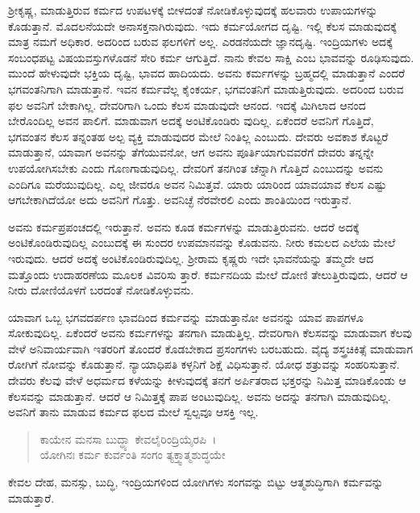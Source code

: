 ಶ‍್ರೀಕೃಷ್ಣ, ಮಾಡುತ್ತಿರುವ ಕರ್ಮದ ಉಪಟಳಕ್ಕೆ ಬೀಳದಂತೆ ನೋಡಿಕೊಳ್ಳುವುದಕ್ಕೆ ಹಲವಾರು ಉಪಾಯಗಳನ್ನು ಕೊಡುತ್ತಾನೆ. ಮೊದಲನೆಯದೇ ಅನಾಸಕ್ತನಾಗಿರುವುದು. ಇದು ಕರ್ಮಯೋಗದ ದೃಷ್ಟಿ. ಇಲ್ಲಿ ಕೆಲಸ ಮಾಡುವುದಕ್ಕೆ ಮಾತ್ರ ನಮಗೆ ಅಧಿಕಾರ. ಅದರಿಂದ ಬರುವ ಫಲಗಳಿಗೆ ಅಲ್ಲ. ಎರಡನೆಯದೇ ಜ್ಞಾನದೃಷ್ಟಿ. ಇಂದ್ರಿಯಗಳು ಅದಕ್ಕೆ ಸಂಬಂಧಪಟ್ಟ ವಿಷಯವಸ್ತುಗಳೊಡನೆ ಸೇರಿ ಕರ್ಮ ಆಗುತ್ತಿದೆ. ನಾನು ಕೇವಲ ಸಾಕ್ಷಿ ಎಂಬ ಭಾವವನ್ನು ರೂಢಿಸುವುದು. ಮುಂದೆ ಹೇಳುವುದೇ ಭಕ್ತಿಯ ದೃಷ್ಟಿ, ಭಾವದ ಹಾದಿಯದು. ಅವನು ಕರ್ಮಗಳನ್ನು ಬ್ರಹ್ಮದಲ್ಲಿ ಮಾಡುತ್ತಾನೆ ಎಂದರೆ ಭಗವಂತನಿಗಾಗಿ ಮಾಡುತ್ತಾನೆ. ಇವನ ಕರ್ಮವೆಲ್ಲ ಕೈಂಕರ್ಯ, ಭಗವಂತನಿಗೆ ಮಾಡುತ್ತಿರುವುದು. ಅದರಿಂದ ಬರುವ ಫಲ ಅವನಿಗೆ ಬೇಕಾಗಿಲ್ಲ. ದೇವರಿಗಾಗಿ ಒಂದು ಕೆಲಸ ಮಾಡುವುದೇ ಆನಂದ. ಇದಕ್ಕೆ ಮಿಗಿಲಾದ ಆನಂದ ಬೇರೊಂದಿಲ್ಲ ಅವನ ಪಾಲಿಗೆ. ಮಾಡುವಾಗ ಅದಕ್ಕೆ ಅಂಟಿಕೊಂಡಿರು ವುದಿಲ್ಲ. ಏಕೆಂದರೆ ಅವನಿಗೆ ಗೊತ್ತಿದೆ, ಭಗವಂತನ ಕೆಲಸ ತನ್ನಂತಹ ಅಲ್ಪ ವ್ಯಕ್ತಿ ಮಾಡುವುದರ ಮೇಲೆ ನಿಂತಿಲ್ಲ ಎಂಬುದು. ದೇವರು ಅವಕಾಶ ಕೊಟ್ಟರೆ ಮಾಡುತ್ತಾನೆ, ಯಾವಾಗ ಅವನನ್ನು ತೆಗೆಯುವನೋ, ಆಗ ಅವನು ಪೂರ್ತಿಯಾಗುವವರೆಗೆ ದೇವರು ತನ್ನನ್ನೇ ಉಪಯೋಗಿಸಬೇಕು ಎಂದು ಗೊಣಗಾಡುವುದಿಲ್ಲ. ದೇವರಿಗೆ ತನಗಿಂತ ಚೆನ್ನಾಗಿ ಗೊತ್ತಿದೆ ಎಂಬುದನ್ನು ಅವನು ಎಂದಿಗೂ ಮರೆಯುವುದಿಲ್ಲ. ಎಲ್ಲ ಜೀವರೂ ಅವನ ನಿಮಿತ್ತವೆ. ಯಾರು ಯಾರಿಂದ ಯಾವಯಾವ ಕೆಲಸ ಎಷ್ಟು ಆಗಬೇಕಾಗಿದೆಯೋ ಅದು ಅವನಿಗೆ ಗೊತ್ತು. ಅವನಿಚ್ಛೆ ನೆರವೇರಲಿ ಎಂದು ಶಾಂತಿಯಿಂದ ಇರುತ್ತಾನೆ.

ಅವನು ಕರ್ಮಪ್ರಪಂಚದಲ್ಲಿ ಇರುತ್ತಾನೆ. ಅವನು ಕೂಡ ಕರ್ಮಗಳನ್ನು ಮಾಡುತ್ತಿರುವನು. ಆದರೆ ಅದಕ್ಕೆ ಅಂಟಿಕೊಂಡಿರುವುದಿಲ್ಲ ಎಂಬುದಕ್ಕೆ ಈ ಸುಂದರ ಉಪಮಾನವನ್ನು ಕೊಡುವನು. ನೀರು ಕಮಲದ ಎಲೆಯ ಮೇಲೆ ಇರುವುದು. ಆದರೆ ಅದಕ್ಕೆ ಅಂಟಿಕೊಂಡಿರುವುದಿಲ್ಲ. ಶ‍್ರೀರಾಮ ಕೃಷ್ಣರು ಇದೇ ಭಾವನೆಯನ್ನು ತಮ್ಮದೇ ಆದ ಮತ್ತೊಂದು ಉದಾಹರಣೆಯ ಮೂಲಕ ವಿವರಿಸು ತ್ತಾರೆ. ಕರ್ಮನದಿಯ ಮೇಲೆ ದೋಣಿ ತೇಲುತ್ತಿರುವುದು, ಆದರೆ ಆ ನೀರು ದೋಣಿಯೊಳಗೆ ಬರದಂತೆ ನೋಡಿಕೊಳ್ಳುವನು.

ಯಾವಾಗ ಒಬ್ಬ ಭಗವದರ್ಪಣ ಭಾವದಿಂದ ಕರ್ಮವನ್ನು ಮಾಡುತ್ತಾನೋ ಅವನನ್ನು ಯಾವ ಪಾಪಗಳೂ ಸೋಕುವುದಿಲ್ಲ. ಏಕೆಂದರೆ ಅವನು ಕರ್ಮಗಳನ್ನು ತನಗಾಗಿ ಮಾಡುತ್ತಿಲ್ಲ. ದೇವರಿಗಾಗಿ ಕೆಲಸವನ್ನು ಮಾಡುವಾಗ ಕೆಲವು ವೇಳೆ ಅನಿವಾರ್ಯವಾಗಿ ಇತರರಿಗೆ ತೊಂದರೆ ಕೊಡಬೇಕಾದ ಪ್ರಸಂಗಗಳು ಬರಬಹುದು. ವೈದ್ಯ ಶಸ್ತ್ರಚಿಕಿತ್ಸೆ ಮಾಡುವಾಗ ರೋಗಿಗೆ ನೋವನ್ನು ಕೊಡುತ್ತಾನೆ. ನ್ಯಾಯಾಧಿಪತಿ ಕಳ್ಳನಿಗೆ ಶಿಕ್ಷೆ ವಿಧಿಸುತ್ತಾನೆ. ಯೋಧ ಶತ್ರುವನ್ನು ಸಂಹರಿಸುತ್ತಾನೆ. ದೇವರು ಕೆಲವು ವೇಳೆ ಅಧರ್ಮದ ಕಳೆಯನ್ನು ಕೀಳುವುದಕ್ಕೆ ತನಗೆ ಅರ್ಪಿತರಾದ ಭಕ್ತರನ್ನು ನಿಮಿತ್ತ ಮಾಡಿಕೊಂಡು ಆ ಕೆಲಸವನ್ನು ಮಾಡುತ್ತಾನೆ. ಆದರೆ ಆ ನಿಮಿತ್ತಕ್ಕೆ ಪಾಪ ಅಂಟುವುದಿಲ್ಲ. ಅವನು ಅದನ್ನು ತನಗಾಗಿ ಮಾಡುವುದಿಲ್ಲ. ಅವನಿಗೆ ತಾನು ಮಾಡುವ ಕರ್ಮದ ಫಲದ ಮೇಲೆ ಸ್ವಲ್ಪವೂ ಆಸಕ್ತಿ ಇಲ್ಲ.

\begin{verse}
ಕಾಯೇನ ಮನಸಾ ಬುದ್ಧ್ಯಾ ಕೇವಲೈರಿಂದ್ರಿಯೈರಪಿ~।\\ಯೋಗಿನಃ ಕರ್ಮ ಕುರ್ವಂತಿ ಸಂಗಂ ತ್ಯಕ್ತ್ವಾತ್ಮಶುದ್ಧಯೇ 
\end{verse}

{\small ಕೇವಲ ದೇಹ, ಮನಸ್ಸು, ಬುದ್ಧಿ, ಇಂದ್ರಿಯಗಳಿಂದ ಯೋಗಿಗಳು ಸಂಗವನ್ನು ಬಿಟ್ಟು ಆತ್ಮಶುದ್ಧಿಗಾಗಿ ಕರ್ಮವನ್ನು ಮಾಡುತ್ತಾರೆ.}

